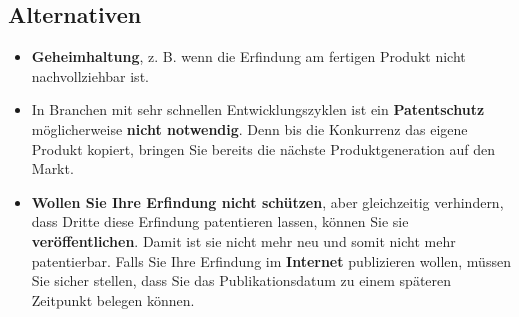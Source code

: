 \subsection{Alternativen}
\begin{itemize}
	\tightlist
	\item \textbf{Geheimhaltung}, z. B. wenn die Erfindung am fertigen Produkt
	nicht nachvollziehbar ist.
	\item In Branchen mit sehr schnellen Entwicklungszyklen ist ein
	\textbf{Patentschutz} möglicherweise \textbf{nicht notwendig}.
	Denn bis die Konkurrenz das eigene Produkt kopiert, bringen Sie bereits die
	nächste Produktgeneration auf den Markt.
	\item \textbf{Wollen Sie Ihre Erfindung nicht schützen},
	aber gleichzeitig verhindern, dass Dritte diese Erfindung patentieren
	lassen, können Sie sie \textbf{veröffentlichen}.
	Damit ist sie nicht mehr neu und somit nicht mehr patentierbar.
	Falls Sie Ihre Erfindung im \textbf{Internet} publizieren wollen,
	müssen Sie sicher stellen, dass Sie das Publikationsdatum zu einem späteren
	Zeitpunkt belegen können.
\end{itemize}
